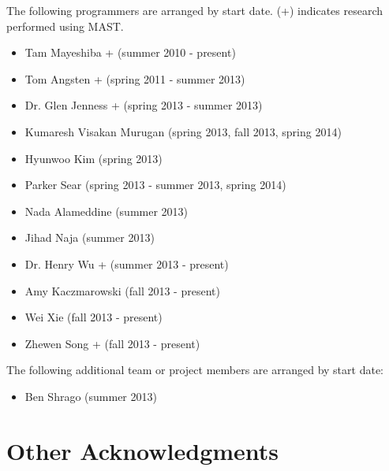 \documentclass[letterpaper,10pt,english]{sphinxmanual}
\begin{document}
The following programmers are arranged by start date. (+) indicates research performed using MAST.
\begin{itemize}
\item {} 
Tam Mayeshiba + (summer 2010 - present)

\item {} 
Tom Angsten + (spring 2011 - summer 2013)

\item {} 
Dr. Glen Jenness + (spring 2013 - summer 2013)

\item {} 
Kumaresh Visakan Murugan (spring 2013, fall 2013, spring 2014)

\item {} 
Hyunwoo Kim (spring 2013)

\item {} 
Parker Sear (spring 2013 - summer 2013, spring 2014)

\item {} 
Nada Alameddine (summer 2013)

\item {} 
Jihad Naja (summer 2013)

\item {} 
Dr. Henry Wu + (summer 2013 - present)

\item {} 
Amy Kaczmarowski (fall 2013 - present)

\item {} 
Wei Xie (fall 2013 - present)

\item {} 
Zhewen Song + (fall 2013 - present)

\end{itemize}

The following additional team or project members are arranged by start date:
\begin{itemize}
\item {} 
Ben Shrago (summer 2013)

\end{itemize}


\section{Other Acknowledgments}
\label{10_0_acknowledgments:other-acknowledgments}
\end{document}
